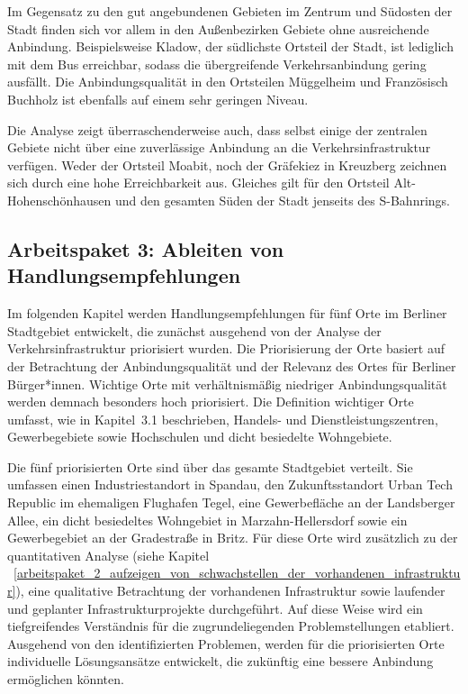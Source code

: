 Im Gegensatz zu den gut angebundenen Gebieten im Zentrum und Südosten der Stadt finden sich vor allem in den Außenbezirken Gebiete ohne ausreichende Anbindung. Beispielsweise Kladow, der südlichste Ortsteil der Stadt, ist lediglich mit dem Bus erreichbar, sodass die übergreifende Verkehrsanbindung gering ausfällt. Die Anbindungsqualität in den Ortsteilen Müggelheim und Französisch Buchholz ist ebenfalls auf einem sehr geringen Niveau.

Die Analyse zeigt überraschenderweise auch, dass selbst einige der zentralen Gebiete nicht über eine zuverlässige Anbindung an die Verkehrsinfrastruktur verfügen. Weder der Ortsteil Moabit, noch der Gräfekiez in Kreuzberg zeichnen sich durch eine hohe Erreichbarkeit aus. Gleiches gilt für den Ortsteil Alt-Hohenschönhausen und den gesamten Süden der Stadt jenseits des S-Bahnrings.

\subsection{Arbeitspaket 3: Ableiten von Handlungsempfehlungen}
\label{arbeitspaket_3_ableiten_von_handlungsempfehlungen}

Im folgenden Kapitel werden Handlungsempfehlungen für fünf Orte im Berliner Stadtgebiet entwickelt, die zunächst ausgehend von der Analyse der Verkehrsinfrastruktur priorisiert wurden. Die Priorisierung der Orte basiert auf der Betrachtung der Anbindungsqualität und der Relevanz des Ortes für Berliner Bürger*innen. Wichtige Orte mit verhältnismäßig niedriger Anbindungsqualität werden demnach besonders hoch priorisiert. Die Definition wichtiger Orte umfasst, wie in Kapitel~3.1 beschrieben, Handels- und Dienstleistungszentren, Gewerbegebiete sowie Hochschulen und dicht besiedelte Wohngebiete.

Die fünf priorisierten Orte sind über das gesamte Stadtgebiet verteilt. Sie umfassen einen Industriestandort in Spandau, den Zukunftsstandort Urban Tech Republic im ehemaligen Flughafen Tegel, eine Gewerbefläche an der Landsberger Allee, ein dicht besiedeltes Wohngebiet in Marzahn-Hellersdorf sowie ein Gewerbegebiet an der Gradestraße in Britz. Für diese Orte wird zusätzlich zu der quantitativen Analyse (siehe Kapitel ~\ref{arbeitspaket_2_aufzeigen_von_schwachstellen_der_vorhandenen_infrastruktur}), eine qualitative Betrachtung der vorhandenen Infrastruktur sowie laufender und geplanter Infrastrukturprojekte durchgeführt. Auf diese Weise wird ein tiefgreifendes Verständnis für die zugrundeliegenden Problemstellungen etabliert. Ausgehend von den identifizierten Problemen, werden für die priorisierten Orte individuelle Lösungsansätze entwickelt, die zukünftig eine bessere Anbindung ermöglichen könnten.

